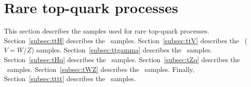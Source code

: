 \section{Rare top-quark processes}

This section describes the samples used for rare top-quark processes.
Section~\ref{subsec:ttH} describes the \ttH\ samples.
Section~\ref{subsec:ttV} describes the \ttV\ ($V=W/Z$) samples.
Section~\ref{subsec:ttgamma} describes the \ttgamma\ samples.
Section~\ref{subsec:tHq} describes the \tH\ samples.
Section~\ref{subsec:tZq} describes the \tZq\ samples.
Section~\ref{subsec:tWZ} describes the \tWZ\ samples.
Finally, Section~\ref{subsec:tttt} describes the \tttt\ samples.







%


